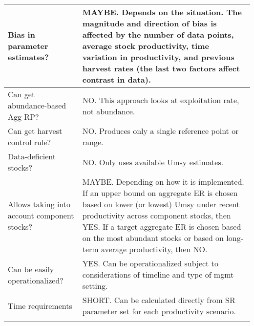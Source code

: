 \documentclass[french,11pt]{book}
\begin{document}
\begin{longtable}[t]{>{\raggedright\arraybackslash}p{9em}>{\raggedright\arraybackslash}p{37em}}
\midrule Bias in parameter estimates? & MAYBE.  Depends on the situation. The magnitude and direction of bias is affected by the number of data points, average stock productivity, time variation in productivity, and previous harvest rates (the last two factors affect contrast in data).\\
\midrule Can get abundance-based Agg RP? & NO. This approach looks at exploitation rate, not abundance.\\
\midrule Can get harvest control rule? & NO.  Produces only a single reference point or range.\\
\midrule Data-deficient stocks? & NO. Only uses available Umsy estimates.\\
\midrule Allows taking into account component stocks? & MAYBE. Depending on how it is implemented. If an upper bound on aggregate ER is chosen based on lower (or lowest)  Umsy under recent productivity across component stocks, then YES.  If a target aggregate ER is chosen based on the most abundant stocks or based on long-term average productivity, then NO.\\
\midrule Can be easily operationalized? & YES. Can be operationalized subject to considerations of timeline and type of mgmt setting.\\
\midrule Time requirements & SHORT. Can be calculated directly from SR parameter set for each productivity scenario.\\* \end{longtable}

\endgroup{} \endgroup{}

\clearpage
\end{document}
